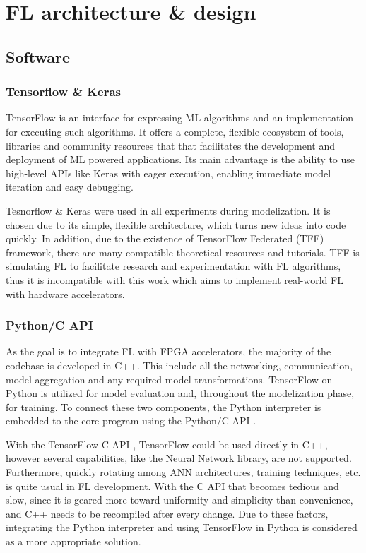 \chapter{FL architecture \& design} %
\label{Chapter-FL-architecture-design}

\section{Software}
\subsection{Tensorflow \& Keras}
TensorFlow \cite{tensorflow2015-whitepaper} is an interface for expressing ML algorithms and an implementation for executing such algorithms. It offers a complete, flexible ecosystem of tools, libraries and community resources that that facilitates the development and deployment of ML powered applications. Its main advantage is the ability to use high-level APIs like Keras with eager execution, enabling immediate model iteration and easy debugging. 

Tesnorflow \& Keras were used in all experiments during modelization. It is chosen due to its simple, flexible architecture, which turns new ideas into code quickly. In addition, due to the existence of TensorFlow Federated (TFF) \cite{tff} framework, there are many compatible theoretical resources and tutorials. TFF is simulating FL to facilitate research and experimentation with FL algorithms, thus it is incompatible with this work which aims to implement real-world FL with hardware accelerators.

\subsection{Python/C API} \label{Python/C API}
As the goal is to integrate FL with FPGA accelerators, the majority of the codebase is developed in C++. This include all the networking, communication, model aggregation and any required model transformations. TensorFlow on Python is utilized for model evaluation and, throughout the modelization phase, for training. To connect these two components, the Python interpreter is embedded to the core program using the Python/C API \cite{Python/C_API, embedding_python}.

With the TensorFlow C API \cite{TF_C_API}, TensorFlow could be used directly in C++, however several capabilities, like the Neural Network library, are not supported. Furthermore, quickly rotating among ANN architectures, training techniques, etc. is quite usual in FL development. With the C API that becomes tedious and slow, since it is geared more toward uniformity and simplicity than convenience, and C++ needs to be recompiled after every change. Due to these factors, integrating the Python interpreter and using TensorFlow in Python is considered as a more appropriate solution.

